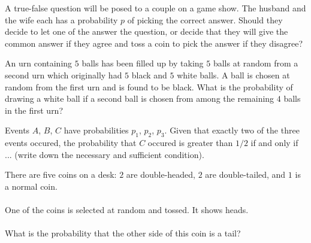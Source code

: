 \begin{problem}[Handout 4, \# 12]
  A true-false question will be posed to a couple on a game show. The
  husband and the wife each has a probability \(p\) of picking the correct
  answer. Should they decide to let one of the answer the question, or
  decide that they will give the common answer if they agree and toss a
  coin to pick the answer if they disagree?
\end{problem}
\begin{solution}

\end{solution}
\newpage

\begin{problem}[Handout 4, \# 13]
  An urn containing \(5\) balls has been filled up by taking \(5\) balls at
  random from a second urn which originally had \(5\) black and \(5\) white
  balls. A ball is chosen at random from the first urn and is found to be
  black. What is the probability of drawing a white ball if a second ball
  is chosen from among the remaining \(4\) balls in the first urn?
\end{problem}
\begin{solution}

\end{solution}
\newpage

\begin{problem}[Handout 4, \# 15]
  Events \(A\), \(B\), \(C\) have probabilities \(p_1\), \(p_2\),
  \(p_3\). Given that exactly two of the three events occured, the
  probability that \(C\) occured is greater than \(1/2\) if and only if
  ... (write down the necessary and sufficient condition).
\end{problem}
\begin{solution}

\end{solution}
\newpage

\begin{problem}[Handout 5, \# 1]
  There are five coins on a desk: \(2\) are double-headed, \(2\) are
  double-tailed, and \(1\) is a normal coin.
  \\\\
  One of the coins is selected at random and tossed. It shows heads.
  \\\\
  What is the probability that the other side of this coin is a tail?
\end{problem}
\begin{solution}

\end{solution}
\newpage


